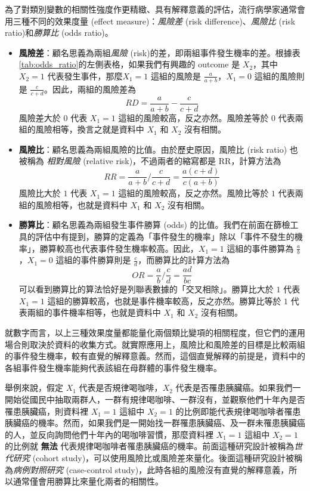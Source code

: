    為了對類別變數的相關性強度作更精緻、具有解釋意義的評估，流行病學家通常會用三種不同的效果度量 (effect measure)：\textit{風險差} (risk difference)、\textit{風險比} (risk ratio)和\textit{勝算比} (odds ratio)。
    \begin{itemize}
        \item \textbf{風險差}：顧名思義為兩組\textit{風險} (risk)的差，即兩組事件發生機率的差。根據表\ref{tab:odds_ratio}的左側表格，如果我們有興趣的 outcome 是 $X_2$，其中 $X_2 = 1$ 代表發生事件，那麼$X_1 = 1$ 這組的風險是 $\frac{a}{a+b}$，$X_1 = 0$ 這組的風險則是 $\frac{c}{c+d}$。因此，兩組的風險差為 
        \[RD = \frac{a}{a+b}-\frac{c}{c+d}\]
        風險差大於 $0$ 代表 $X_1 = 1$ 這組的風險較高，反之亦然。風險差等於 $0$ 代表兩組的風險相等，換言之就是資料中 $X_1$ 和 $X_2$ 沒有相關。
        \item \textbf{風險比}：顧名思義為兩組風險的比值。由於歷史原因，風險比 (risk ratio) 也被稱為 \textit{相對風險} (relative risk)，不過兩者的縮寫都是 RR，計算方法為
        \[RR = \frac{a}{a+b}\Big/\frac{c}{c+d} = \frac{a(c+d)}{c(a+b)}\]
        風險比大於 $1$ 代表 $X_1 = 1$ 這組的風險較高，反之亦然。風險比等於 $1$ 代表兩組的風險相等，也就是資料中 $X_1$ 和 $X_2$ 沒有相關。
        \item \textbf{勝算比}：顧名思義為兩組發生事件勝算 (odds) 的比值。我們在前面在篩檢工具的評估中有提到，勝算的定義為「事件發生的機率」除以「事件不發生的機率」，勝算較高也代表事件發生機率較高。因此，$X_1 = 1$ 這組的事件勝算為 $\frac{a}{b}$，$X_1 = 0$ 這組的事件勝算則是 $\frac{c}{d}$，而勝算比的計算方法為
        \[OR = \frac{a}{b}\Big/\frac{c}{d} = \frac{ad}{bc}\]
        可以看到勝算比的算法恰好是列聯表數據的「交叉相除」。勝算比大於 $1$ 代表 $X_1 = 1$ 這組的勝算較高，也就是事件機率較高，反之亦然。勝算比等於 $1$ 代表兩組的事件機率相等，也就是資料中 $X_1$ 和 $X_2$ 沒有相關。
    \end{itemize}
    就數字而言，以上三種效果度量都能量化兩個類比變項的相關程度，但它們的運用場合則取決於資料的收集方式。就實際應用上，風險比和風險差的目標是比較兩組的事件發生機率，較有直覺的解釋意義。然而，這個直覺解釋的前提是，資料中的各組事件發生機率能夠代表該組在母群體的事件發生機率。
    
    舉例來說，假定 $X_1$ 代表是否規律喝咖啡，$X_2$ 代表是否罹患胰臟癌。如果我們一開始從國民中抽取兩群人，一群有規律喝咖啡、一群沒有，並觀察他們十年內是否罹患胰臟癌，則資料裡 $X_1 = 1$ 這組中 $X_2 = 1$ 的比例即能代表規律喝咖啡者罹患胰臟癌的機率。然而，如果我們是一開始找一群罹患胰臟癌、及一群未罹患胰臟癌的人，並反向詢問他們十年內的喝咖啡習慣，那麼資料裡 $X_1 = 1$ 這組中 $X_2 = 1$ 的比例就 \textbf{無法} 代表規律喝咖啡者罹患胰臟癌的機率。前面這種研究設計被稱為\textit{世代研究} (cohort study)，可以使用風險比或風險差來量化。後面這種研究設計被稱為\textit{病例對照研究} (case-control study)，此時各組的風險沒有直覺的解釋意義，所以通常僅會用勝算比來量化兩者的相關性。

